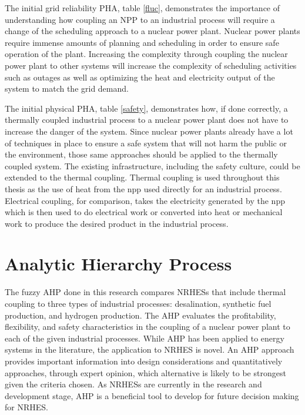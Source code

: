 The initial grid reliability PHA, table \ref{fluc}, demonstrates the importance of understanding how coupling an NPP to an industrial process will require a change of the scheduling approach to a nuclear power plant. Nuclear power plants require immense amounts of planning and scheduling in order to ensure safe operation of the plant.  Increasing the complexity through coupling the nuclear power plant to other systems will increase the complexity of scheduling activities such as outages as well as optimizing the heat and electricity output of the system to match the grid demand.

The initial physical PHA, table \ref{safety},  demonstrates how, if done correctly, a thermally coupled industrial process to a nuclear power plant does not have to increase the danger of the system.  Since nuclear power plants already have a lot of techniques in place to ensure a safe system that will not harm the public or the environment, those same approaches should be applied to the thermally coupled system. The existing infrastructure, including the safety culture, could be extended to the thermal coupling. Thermal coupling is used throughout this thesis as the use of heat from the \ac{npp} used directly for an industrial process.  Electrical coupling, for comparison, takes the electricity generated by the \ac{npp} which is then used to do electrical work or converted into heat or mechanical work to produce the desired product in the industrial process.


\section{Analytic Hierarchy Process}
The fuzzy AHP done in this research compares NRHESs that include thermal coupling to three types of industrial processes: desalination, synthetic fuel production, and hydrogen production.  The AHP evaluates the profitability, flexibility, and safety characteristics in the coupling of a nuclear power plant to each of the given industrial processes. While AHP has been applied to energy systems in the literature, the application to NRHES is novel. An AHP approach provides important information into design considerations and quantitatively approaches, through expert opinion, which alternative is likely to be strongest given the criteria chosen. As NRHESs are currently in the research and development stage, AHP is a beneficial tool to develop for future decision making for NRHES.

